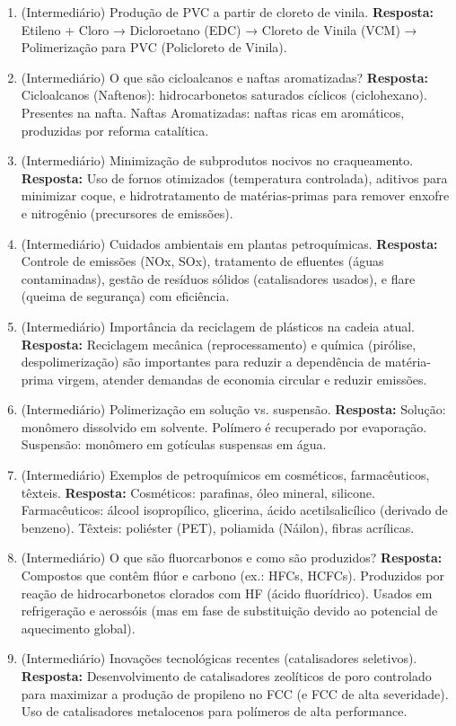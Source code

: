 \documentclass[11pt,a4paper]{article}
\begin{document}
\begin{enumerate}
  \item (Intermediário) Produção de PVC a partir de cloreto de vinila.
  \textbf{Resposta:} Etileno + Cloro → Dicloroetano (EDC) → Cloreto de Vinila (VCM) → Polimerização para PVC (Policloreto de Vinila).

  \item (Intermediário) O que são cicloalcanos e naftas aromatizadas?
  \textbf{Resposta:} Cicloalcanos (Naftenos): hidrocarbonetos saturados cíclicos (ciclohexano). Presentes na nafta. Naftas Aromatizadas: naftas ricas em aromáticos, produzidas por reforma catalítica.

  \item (Intermediário) Minimização de subprodutos nocivos no craqueamento.
  \textbf{Resposta:} Uso de fornos otimizados (temperatura controlada), aditivos para minimizar coque, e hidrotratamento de matérias-primas para remover enxofre e nitrogênio (precursores de emissões).

  \item (Intermediário) Cuidados ambientais em plantas petroquímicas.
  \textbf{Resposta:} Controle de emissões (NOx, SOx), tratamento de efluentes (águas contaminadas), gestão de resíduos sólidos (catalisadores usados), e flare (queima de segurança) com eficiência.

  \item (Intermediário) Importância da reciclagem de plásticos na cadeia atual.
  \textbf{Resposta:} Reciclagem mecânica (reprocessamento) e química (pirólise, despolimerização) são importantes para reduzir a dependência de matéria-prima virgem, atender demandas de economia circular e reduzir emissões.

  \item (Intermediário) Polimerização em solução vs. suspensão.
  \textbf{Resposta:} Solução: monômero dissolvido em solvente. Polímero é recuperado por evaporação. Suspensão: monômero em gotículas suspensas em água.

  \item (Intermediário) Exemplos de petroquímicos em cosméticos, farmacêuticos, têxteis.
  \textbf{Resposta:} Cosméticos: parafinas, óleo mineral, silicone. Farmacêuticos: álcool isopropílico, glicerina, ácido acetilsalicílico (derivado de benzeno). Têxteis: poliéster (PET), poliamida (Náilon), fibras acrílicas.

  \item (Intermediário) O que são fluorcarbonos e como são produzidos?
  \textbf{Resposta:} Compostos que contêm flúor e carbono (ex.: HFCs, HCFCs). Produzidos por reação de hidrocarbonetos clorados com HF (ácido fluorídrico). Usados em refrigeração e aerossóis (mas em fase de substituição devido ao potencial de aquecimento global).

  \item (Intermediário) Inovações tecnológicas recentes (catalisadores seletivos).
  \textbf{Resposta:} Desenvolvimento de catalisadores zeolíticos de poro controlado para maximizar a produção de propileno no FCC (e FCC de alta severidade). Uso de catalisadores metalocenos para polímeros de alta performance.
\end{enumerate}
\end{document}
